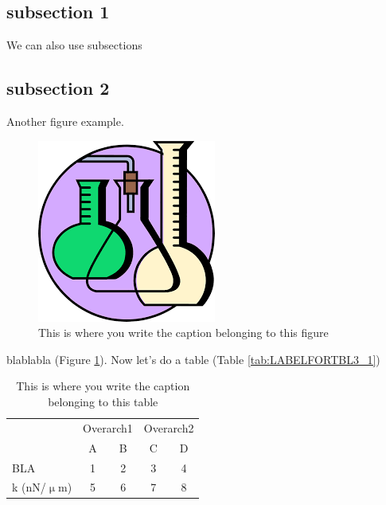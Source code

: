 \begin{refsection}
\subsection{subsection 1}
We can also use subsections 


\subsection{subsection 2}
Another figure example.

\begin{figure}
\begin{center}
\includegraphics[width=0.7\columnwidth]{./C4_Topic3/figure_2/fig2.png}
\caption{\label{fig:LABELFORFIG4_2} This is where you write the caption belonging to this figure}
\end{center}
\end{figure}


blablabla (Figure \ref{fig:LABELFORFIG4_2}). Now let's do a table (Table \ref{tab:LABELFORTBL3_1})

\begin{table}[H]
\centering
\begin{tabular}{l c c | c c}
 	& 	\multicolumn{2}{c}{Overarch1}   		& \multicolumn{2}{c}{Overarch2} \\
 	& A & B 	& C & D \\
\cline{2-5}
BLA & 1 & 2 & 3 & 4 \\
k (nN/$\upmu$m) & 5 & 6 & 7 & 8 \\
\cline{2-5}
\end{tabular}

\caption{\label{tab:LABELFORTBL4_1}This is where you write the caption belonging to this table}
\end{table}

\newpage
\printbibliography[title={Bibliography}]
\end{refsection}

